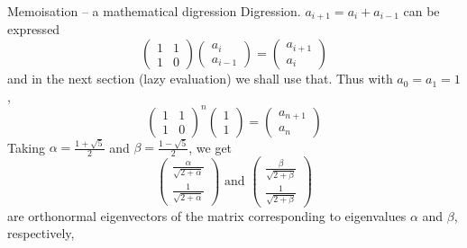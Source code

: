 \documentclass[presentation]{beamer}
\begin{document}
\begin{frame}{Memoisation -- a mathematical digression}
  Digression.  $a_{i+1}=a_i+a_{i-1}$ can be expressed
  \begin{equation*}
    \left(\begin{array}{cc} 1 & 1 \\ 1 & 0 
    \end{array}\right)
    \left(
    \begin{array}{c} a_i \\ a_{i-1} 
    \end{array}
    \right)
    =\left(\begin{array}{c}
    a_{i+1} \\ a_i
    \end{array}\right)
  \end{equation*}
and in the next section (lazy evaluation) we shall use that.  Thus with $a_0=a_1=1$,
  \begin{equation*}
    \left(\begin{array}{cc} 1 & 1 \\ 1 & 0 
    \end{array}\right)^n
    \left(
    \begin{array}{c} 1 \\ 1
    \end{array}
    \right)
    =\left(\begin{array}{c}
    a_{n+1} \\ a_n
    \end{array}\right)
  \end{equation*}
  Taking $\alpha=\frac{1+\sqrt{5}}{2}$ and $\beta=\frac{1-\sqrt{5}}{2}$, we get
  \begin{equation*}
    \left(\begin{array}{c}
      \frac{\alpha}{\sqrt{2+\alpha}} \\
      \frac{1}{\sqrt{2+\alpha}}
    \end{array}\right)
    \text{ and }
    \left(\begin{array}{c}
      \frac{\beta}{\sqrt{2+\beta}} \\
      \frac{1}{\sqrt{2+\beta}}
    \end{array}\right)
  \end{equation*}
    are orthonormal eigenvectors of the matrix corresponding to eigenvalues $\alpha$ and $\beta$, respectively,
\end{frame}
\end{document}
